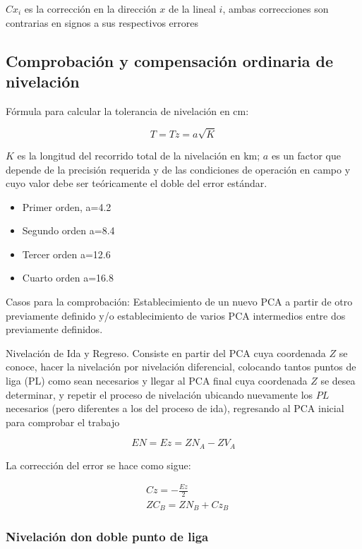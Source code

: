 $Cx_i$ es la corrección en la dirección $x$ de la lineal $i$, ambas correcciones son contrarias en signos a sus respectivos errores


\subsection{Comprobación y compensación ordinaria de nivelación}

Fórmula para calcular la tolerancia de nivelación en cm:

\begin{equation}
    T=Tz=a\sqrt{K}
\end{equation}

$K$ es la longitud del recorrido total de la nivelación en km; $a$ es un factor que depende de la precisión requerida y de las condiciones de operación en campo y cuyo valor debe ser teóricamente el doble del error estándar.

\begin{itemize}
    \item Primer orden, a=4.2
    \item Segundo orden a=8.4
    \item Tercer orden a=12.6
    \item Cuarto orden a=16.8
\end{itemize}

Casos para la comprobación: Establecimiento de un nuevo PCA  a partir de otro previamente definido y/o establecimiento de varios PCA intermedios entre dos previamente definidos.


Nivelación de Ida y Regreso. Consiste en partir del PCA cuya coordenada $Z$ se conoce, hacer la nivelación por nivelación diferencial, colocando tantos puntos de liga (PL)
como sean necesarios y llegar al PCA final cuya coordenada $Z$ se desea determinar, y repetir el proceso de nivelación ubicando nuevamente los $PL$ necesarios (pero diferentes a los del proceso de ida), regresando al PCA inicial para comprobar el trabajo

\begin{equation}
    EN=Ez=ZN_A-ZV_A
\end{equation}

La corrección del error se hace como sigue:

\begin{align}
    &Cz=-\frac{Ez}{2}\\
    &ZC_B=ZN_B+Cz_B
\end{align}

\subsubsection{Nivelación don doble punto de liga}

